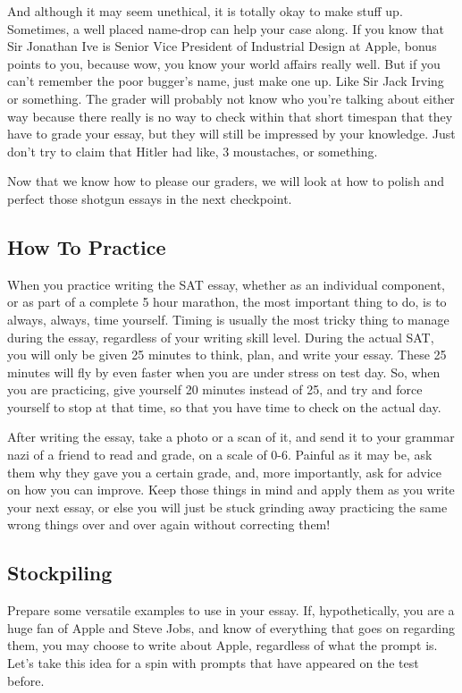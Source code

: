 \documentclass[DIV=calc,11pt,parskip,numbers=noenddot]{scrartcl} %
\begin{document}
And although it may seem unethical, it is totally okay to make stuff up. Sometimes, a well placed name-drop can help your case along. If you know that Sir Jonathan Ive is Senior Vice President of Industrial Design at Apple, bonus points to you, because wow, you know your world affairs really well. But if you can’t remember the poor bugger’s name, just make one up. Like Sir Jack Irving or something. The grader will probably not know who you’re talking about either way because there really is no way to check within that short timespan that they have to grade your essay, but they will still be impressed by your knowledge. Just don’t try to claim that Hitler had like, 3 moustaches, or something.

Now that we know how to please our graders, we will look at how to polish and perfect those shotgun essays in the next checkpoint.
\subsection{How To Practice}
When you practice writing the SAT essay, whether as an individual component, or as part of a complete 5 hour marathon, the most important thing to do, is to always, always, time yourself. Timing is usually the most tricky thing to manage during the essay, regardless of your writing skill level. During the actual SAT, you will only be given 25 minutes to think, plan, and write your essay. These 25 minutes will fly by even faster when you are under stress on test day. So, when you are practicing, give yourself 20 minutes instead of 25, and try and force yourself to stop at that time, so that you have time to check on the actual day.

After writing the essay, take a photo or a scan of it, and send it to your grammar nazi of a friend to read and grade, on a scale of 0-6. Painful as it may be, ask them why they gave you a certain grade, and, more importantly, ask for advice on how you can improve. Keep those things in mind and apply them as you write your next essay, or else you will just be stuck grinding away practicing the same wrong things over and over again without correcting them!
\subsection{Stockpiling}
Prepare some versatile examples to use in your essay. If, hypothetically, you are a huge fan of Apple and Steve Jobs, and know of everything that goes on regarding them, you may choose to write about Apple, regardless of what the prompt is. Let’s take this idea for a spin with prompts that have appeared on the test before.
\end{document}
